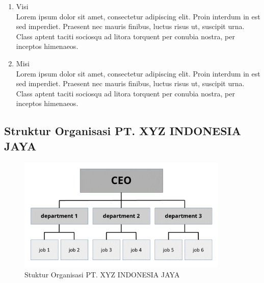 \begin{enumerate}
    \item Visi \\
          Lorem ipsum dolor sit amet, consectetur adipiscing elit. Proin interdum in est sed imperdiet. Praesent nec mauris finibus, luctus risus ut, suscipit urna. Class aptent taciti sociosqu ad litora torquent per conubia nostra, per inceptos himenaeos.
    \item Misi \\
          Lorem ipsum dolor sit amet, consectetur adipiscing elit. Proin interdum in est sed imperdiet. Praesent nec mauris finibus, luctus risus ut, suscipit urna. Class aptent taciti sociosqu ad litora torquent per conubia nostra, per inceptos himenaeos.
\end{enumerate}

\subsection{Struktur Organisasi PT. XYZ INDONESIA JAYA}

\begin{figure}[H]
    \centering
    \includegraphics[width=10cm]{assets/pics/dummy-organizational-chart.png}
    \caption{Stuktur Organisasi PT. XYZ INDONESIA JAYA}
    \label{fig:organizationalChart}
\end{figure}

